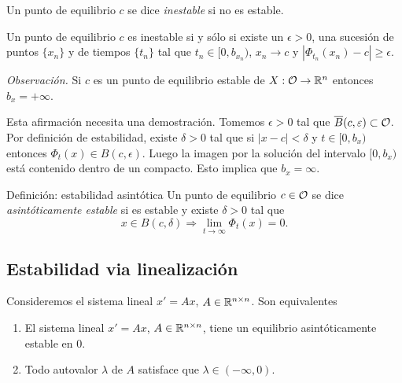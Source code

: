   


\begin{definicion} 
	      Un punto de equilibrio $c$ se dice \emph{inestable} si no es estable.
 \end{definicion}            

\begin{ejercicio} Un punto de equilibrio $c$ es inestable si y sólo si existe
               un $\epsilon>0$,  una sucesión  de puntos $\{x_n\}$ y de tiempos $\{t_n\}$ tal que $t_n\in [0,b_{x_n})$, 
		$x_n\to c$ y $|\Phi_{t_n}(x_n)-c|\geq \epsilon$.
	    
\end{ejercicio}



 \noindent\emph{Observación.} Si $c$  es un punto de equilibrio estable de $X:\mathcal{O}\to\mathbb{R}^n$ entonces $b_x=+\infty$.
 
Esta afirmación necesita una demostración. Tomemos $\epsilon>0$ tal que $\overline{B}(c,\varepsilon)\subset\mathcal{O}$. 
Por definición de estabilidad, existe $\delta>0$ tal que si $|x-c|<\delta$ y $t\in[0,b_x)$ entonces
$\Phi_t(x)\in B(c,\epsilon)$. Luego la imagen por la solución del intervalo $[0,b_x)$ está contenido dentro
de un compacto. Esto implica que $b_x=\infty$. 
 

\begin{definicion}
 {Definición: estabilidad asintótica} Un punto de equilibrio $c\in\mathcal{O}$ se dice 
  \emph{asintóticamente estable} si es estable y existe $\delta>0$ tal que
  \[x\in B(c,\delta)\Rightarrow \lim_{t\to\infty}\Phi_t(x)=0.\]
  \end{definicion}  
 

 
 \subsection{Estabilidad via linealización}
 

\begin{teorema}
 Consideremos el sistema lineal $x'=Ax$, $A\in\mathbb{R}^{n\times n}$.  Son equivalentes
  \begin{enumerate}
   \item El sistema lineal $x'=Ax$, $A\in\mathbb{R}^{n\times n}$, tiene un equilibrio asintóticamente estable en $0$.
   \item Todo autovalor $\lambda$  de $A$ satisface que $\lambda\in (-\infty,0)$.
  \end{enumerate}
 
\end{teorema}

